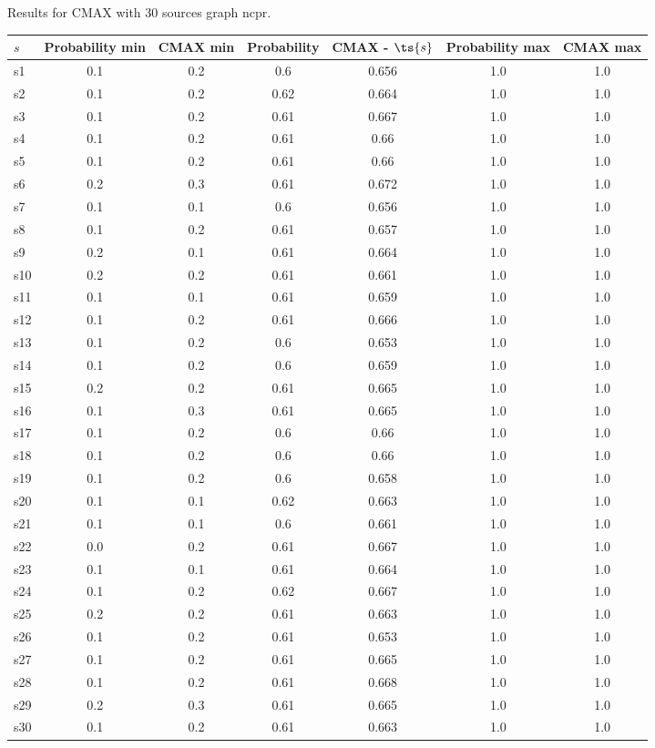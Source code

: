 \documentclass{article}
\begin{document}
\noindent Results for CMAX with 30 sources graph ncpr.

\noindent\begin{tabular}{|l|c|c|c|c|c|c|}
\hline
$s$& Probability min & CMAX min & Probability & CMAX - $\ts{s}$ & Probability max & CMAX max\\
\hline
s1 &0.1 & 0.2 & 0.6 & 0.656 & 1.0 & 1.0\\
\hline
s2 &0.1 & 0.2 & 0.62 & 0.664 & 1.0 & 1.0\\
\hline
s3 &0.1 & 0.2 & 0.61 & 0.667 & 1.0 & 1.0\\
\hline
s4 &0.1 & 0.2 & 0.61 & 0.66 & 1.0 & 1.0\\
\hline
s5 &0.1 & 0.2 & 0.61 & 0.66 & 1.0 & 1.0\\
\hline
s6 &0.2 & 0.3 & 0.61 & 0.672 & 1.0 & 1.0\\
\hline
s7 &0.1 & 0.1 & 0.6 & 0.656 & 1.0 & 1.0\\
\hline
s8 &0.1 & 0.2 & 0.61 & 0.657 & 1.0 & 1.0\\
\hline
s9 &0.2 & 0.1 & 0.61 & 0.664 & 1.0 & 1.0\\
\hline
s10 &0.2 & 0.2 & 0.61 & 0.661 & 1.0 & 1.0\\
\hline
s11 &0.1 & 0.1 & 0.61 & 0.659 & 1.0 & 1.0\\
\hline
s12 &0.1 & 0.2 & 0.61 & 0.666 & 1.0 & 1.0\\
\hline
s13 &0.1 & 0.2 & 0.6 & 0.653 & 1.0 & 1.0\\
\hline
s14 &0.1 & 0.2 & 0.6 & 0.659 & 1.0 & 1.0\\
\hline
s15 &0.2 & 0.2 & 0.61 & 0.665 & 1.0 & 1.0\\
\hline
s16 &0.1 & 0.3 & 0.61 & 0.665 & 1.0 & 1.0\\
\hline
s17 &0.1 & 0.2 & 0.6 & 0.66 & 1.0 & 1.0\\
\hline
s18 &0.1 & 0.2 & 0.6 & 0.66 & 1.0 & 1.0\\
\hline
s19 &0.1 & 0.2 & 0.6 & 0.658 & 1.0 & 1.0\\
\hline
s20 &0.1 & 0.1 & 0.62 & 0.663 & 1.0 & 1.0\\
\hline
s21 &0.1 & 0.1 & 0.6 & 0.661 & 1.0 & 1.0\\
\hline
s22 &0.0 & 0.2 & 0.61 & 0.667 & 1.0 & 1.0\\
\hline
s23 &0.1 & 0.1 & 0.61 & 0.664 & 1.0 & 1.0\\
\hline
s24 &0.1 & 0.2 & 0.62 & 0.667 & 1.0 & 1.0\\
\hline
s25 &0.2 & 0.2 & 0.61 & 0.663 & 1.0 & 1.0\\
\hline
s26 &0.1 & 0.2 & 0.61 & 0.653 & 1.0 & 1.0\\
\hline
s27 &0.1 & 0.2 & 0.61 & 0.665 & 1.0 & 1.0\\
\hline
s28 &0.1 & 0.2 & 0.61 & 0.668 & 1.0 & 1.0\\
\hline
s29 &0.2 & 0.3 & 0.61 & 0.665 & 1.0 & 1.0\\
\hline
s30 &0.1 & 0.2 & 0.61 & 0.663 & 1.0 & 1.0\\
\hline
\end{tabular}\\
\end{document}
